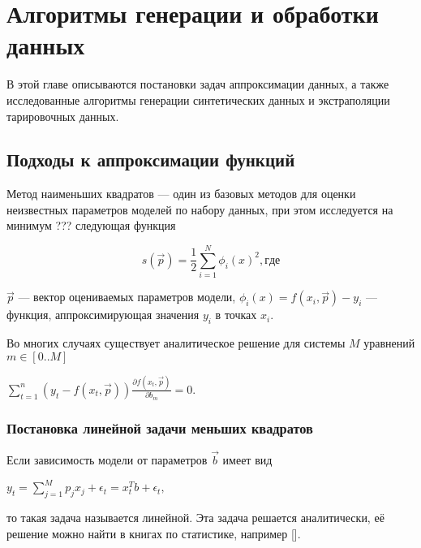 \chapter{Алгоритмы генерации и обработки данных} \label{chapt2}

В этой главе описываются постановки задач аппроксимации данных, а также исследованные алгоритмы генерации 
синтетических данных и
экстраполяции тарировочных данных. 


\section{Подходы к аппроксимации функций}\label{sect2_1}
Метод наименьших квадратов --- один из базовых методов для оценки неизвестных 
параметров моделей по набору данных, при этом исследуется на минимум ???
следующая функция

\begin{equation}
\label{eq:square_minimum}
s(\vec{p}) = \frac{1}{2} \displaystyle \sum_{i=1}^N \phi_i(x)^2 , где
\end{equation}




$\vec{p}$ --- вектор оцениваемых параметров модели, $\phi_i(x) = f(x_i, \vec{p}) - y_i $
--- функция, аппроксимирующая значения $y_i$ в точках $x_i$.

Во многих случаях существует аналитическое решение для системы $M$ уравнений 
$m \in [0..M]$
\begin{center}
 $ \displaystyle\sum_{t = 1}^n \left( y_t - f(x_t,\vec{p})\right) 
 \frac{\partial f(x_t, \vec{p})}{\partial b_m} = 0.$
\end{center}

\subsection{Постановка линейной задачи меньших квадратов}

Если зависимость модели от параметров $\vec{b}$ имеет вид 

\begin{center}
$ y_t = \displaystyle\sum_{j=1}^{M}p_j x_j + \epsilon_t = 
x^T_tb + \epsilon_t, $ 
\end{center}
 то такая задача называется линейной. Эта задача решается аналитически, 
её решение можно найти в книгах по статистике, например [].



